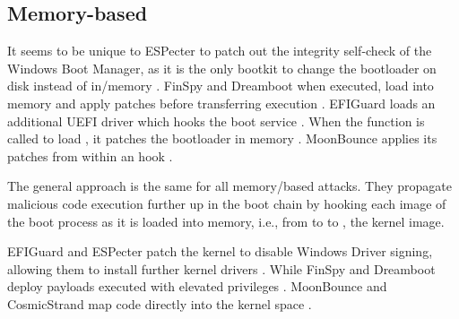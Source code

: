 \subsection{Memory-based}

It seems to be unique to ESPecter to patch out the integrity self-check of the Windows Boot Manager, as it is the only bootkit to change the bootloader on disk instead of in\-/memory \cite{especter}.
FinSpy and Dreamboot when executed, load  into memory and apply patches before transferring execution \cite{finspy, dreamboot}.
EFIGuard loads an additional \ac{UEFI} driver which hooks the boot service .
When the function is called to load , it patches the bootloader in memory \cite{efiguard}.
MoonBounce applies its patches from within an  hook \cite{moonbounce}.

The general approach is the same for all memory\-/based attacks.
They propagate malicious code execution further up in the boot chain by hooking each image of the boot process as it is loaded into memory, i.e., from  to  to , the kernel image.

EFIGuard and ESPecter patch the kernel to disable Windows Driver signing, allowing them to install further kernel drivers \cite{efiguard,especter}.
While FinSpy and Dreamboot deploy payloads executed with elevated privileges \cite{finspy,dreamboot}.
MoonBounce and CosmicStrand map code directly into the kernel space \cite{moonbounce,cosmicstrand}.